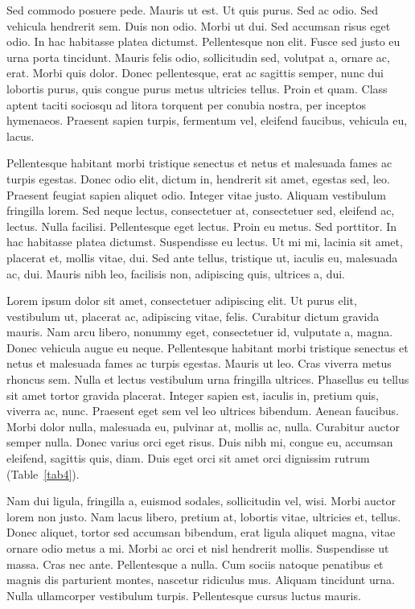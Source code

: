 \documentclass[AMA,Times1COL]{WileyNJDv5} %
\begin{document}

Sed commodo posuere pede. Mauris ut est. Ut quis purus. Sed ac odio. Sed vehicula hendrerit sem. Duis non odio.
Morbi ut dui. Sed accumsan risus eget odio. In hac habitasse platea dictumst. Pellentesque non elit. Fusce sed justo
eu urna porta tincidunt. Mauris felis odio, sollicitudin sed, volutpat a, ornare ac, erat. Morbi quis dolor. Donec
pellentesque, erat ac sagittis semper, nunc dui lobortis purus, quis congue purus metus ultricies tellus. Proin et quam.
Class aptent taciti sociosqu ad litora torquent per conubia nostra, per inceptos hymenaeos. Praesent sapien turpis,
fermentum vel, eleifend faucibus, vehicula eu, lacus.

Pellentesque habitant morbi tristique senectus et netus et malesuada fames ac turpis egestas. Donec odio elit,
dictum in, hendrerit sit amet, egestas sed, leo. Praesent feugiat sapien aliquet odio. Integer vitae justo. Aliquam
vestibulum fringilla lorem. Sed neque lectus, consectetuer at, consectetuer sed, eleifend ac, lectus. Nulla facilisi.
Pellentesque eget lectus. Proin eu metus. Sed porttitor. In hac habitasse platea dictumst. Suspendisse eu lectus. Ut
mi mi, lacinia sit amet, placerat et, mollis vitae, dui. Sed ante tellus, tristique ut, iaculis eu, malesuada ac, dui.
Mauris nibh leo, facilisis non, adipiscing quis, ultrices a, dui.


Lorem ipsum dolor sit amet, consectetuer adipiscing elit. Ut purus elit, vestibulum ut, placerat ac, adipiscing vitae,
felis. Curabitur dictum gravida mauris. Nam arcu libero, nonummy eget, consectetuer id, vulputate a, magna. Donec
vehicula augue eu neque. Pellentesque habitant morbi tristique senectus et netus et malesuada fames ac turpis egestas.
Mauris ut leo. Cras viverra metus rhoncus sem. Nulla et lectus vestibulum urna fringilla ultrices. Phasellus eu tellus
sit amet tortor gravida placerat. Integer sapien est, iaculis in, pretium quis, viverra ac, nunc. Praesent eget sem vel
leo ultrices bibendum. Aenean faucibus. Morbi dolor nulla, malesuada eu, pulvinar at, mollis ac, nulla. Curabitur
auctor semper nulla. Donec varius orci eget risus. Duis nibh mi, congue eu, accumsan eleifend, sagittis quis, diam.
Duis eget orci sit amet orci dignissim rutrum (Table~\ref{tab4}).

Nam dui ligula, fringilla a, euismod sodales, sollicitudin vel, wisi. Morbi auctor lorem non justo. Nam lacus libero,
pretium at, lobortis vitae, ultricies et, tellus. Donec aliquet, tortor sed accumsan bibendum, erat ligula aliquet magna,
vitae ornare odio metus a mi. Morbi ac orci et nisl hendrerit mollis. Suspendisse ut massa. Cras nec ante. Pellentesque
a nulla. Cum sociis natoque penatibus et magnis dis parturient montes, nascetur ridiculus mus. Aliquam tincidunt
urna. Nulla ullamcorper vestibulum turpis. Pellentesque cursus luctus mauris.
\end{document}

